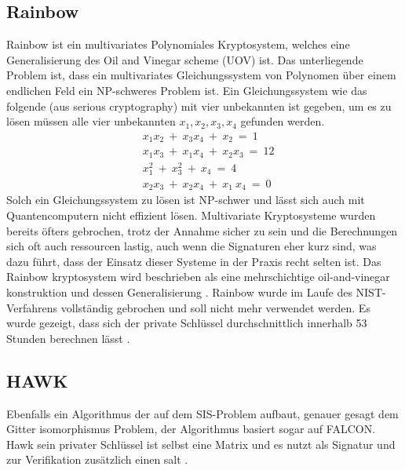 \subsection{Rainbow}
Rainbow ist ein multivariates Polynomiales Kryptosystem, welches eine Generalisierung des Oil and Vinegar scheme (UOV) ist.
Das unterliegende Problem ist, dass ein multivariates Gleichungssystem von Polynomen über einem endlichen Feld ein NP-schweres Problem ist.
Ein Gleichungssystem wie das folgende (aus serious cryptography\cite{aumassonSeriousCryptographyPractical2018}) mit vier unbekannten ist gegeben, um es zu lösen müssen alle vier unbekannten $x_1,x_2,x_3,x_4$ gefunden werden.
\begin{align*}
&x_1x_2\ +\ x_3x_4\ +\ x_2\ =\ 1\\
&x_1x_3\ +\ x_1x_4\ +\ x_2x_3\ =\ 12\\
&x_{1}^2\ +\ x_{3}^2\ +\ x_4\ =\ 4\\
&x_2x_3\ +\ x_2x_4\ +\ x_1\ x_4\ =\ 0
\end{align*}
Solch ein Gleichungssystem zu lösen ist NP-schwer und lässt sich auch mit Quantencomputern nicht effizient lösen.
Multivariate Kryptosysteme wurden bereits öfters gebrochen, trotz der Annahme sicher zu sein und die Berechnungen sich oft auch ressourcen lastig, auch wenn die Signaturen eher kurz sind, was dazu führt, dass der Einsatz dieser Systeme in der Praxis recht selten ist\cite{aumassonSeriousCryptographyPractical2018}.
Das Rainbow kryptosystem wird beschrieben als eine mehrschichtige oil-and-vinegar konstruktion und dessen Generalisierung \cite{dingRainbowNewMultivariable2005}.
Rainbow wurde im Laufe des NIST-Verfahrens vollständig gebrochen und soll nicht mehr verwendet werden.
Es wurde gezeigt, dass sich der private Schlüssel durchschnittlich innerhalb 53 Stunden berechnen lässt \cite{beullensBreakingRainbowTakes2022}.

\subsection{HAWK}
Ebenfalls ein Algorithmus der auf dem SIS-Problem aufbaut, genauer gesagt dem Gitter isomorphismus Problem, der Algorithmus basiert sogar auf FALCON.
Hawk sein privater Schlüssel ist selbst eine Matrix und es nutzt als Signatur und zur Verifikation zusätzlich einen salt \cite{saarinenPostQuantumCryptography15th2024}.

